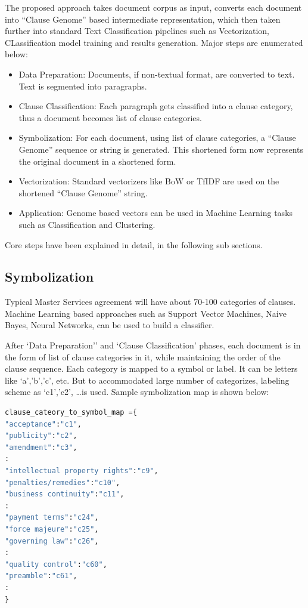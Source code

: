 \documentclass[9pt,academicons]{article}
\begin{document}
The proposed approach takes document corpus as input, converts each document into ``Clause Genome'' based intermediate representation, which then taken further into standard Text Classification pipelines such as Vectorization, CLassification model training and results generation. Major steps are enumerated below:

 \begin{itemize}
 \item Data Preparation: Documents, if non-textual format, are converted to text. Text is segmented into paragraphs.
  \item Clause Classification: Each paragraph gets classified into a clause category, thus a document becomes list of clause categories.
\item Symbolization: For each document, using list of clause categories, a ``Clause Genome'' sequence or string is generated. This shortened form now represents the original document in a shortened form.
\item Vectorization: Standard vectorizers like BoW or TfIDF are used on the shortened ``Clause Genome'' string.
\item Application: Genome based vectors can be used in Machine Learning tasks such as Classification and Clustering.
 \end{itemize}

Core steps have been explained in detail, in the following sub sections.

\subsection{Symbolization}
\label{subsec:symbolization}

Typical Master Services agreement will have about 70-100 categories of clauses. Machine Learning based approaches such as Support Vector Machines, Naive Bayes, Neural Networks, can be used to build a classifier. 

After `Data Preparation'' and `Clause Classification' phases, each document is in the form of list of clause categories in it, while maintaining the order of the clause sequence. Each category is mapped to a symbol or label. It can be letters like `a','b','c', etc. But to accommodated large number of categorizes, labeling scheme as `c1','c2', \ldots is used. Sample symbolization map is shown below:

\begin{lstlisting}[language=Python, basicstyle=\footnotesize ]
clause_cateory_to_symbol_map ={ 
"acceptance":"c1", 
"publicity":"c2", 
"amendment":"c3", 
:
"intellectual property rights":"c9", 
"penalties/remedies":"c10", 
"business continuity":"c11", 
:
"payment terms":"c24", 
"force majeure":"c25", 
"governing law":"c26", 
:
"quality control":"c60", 
"preamble":"c61", 
:
}
\end{lstlisting}
\end{document}
